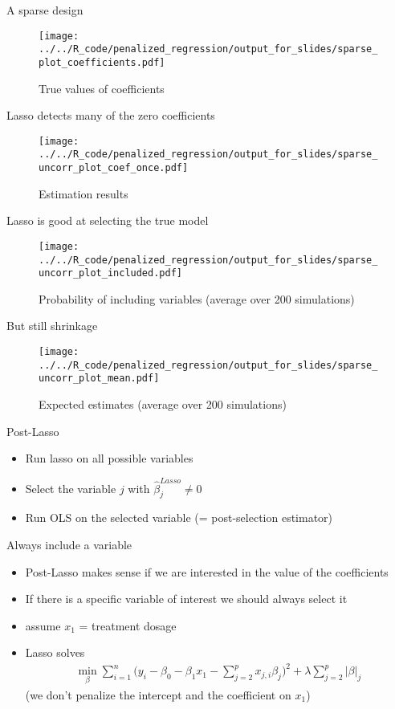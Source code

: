 \documentclass[xcolor=dvipsnames]{beamer}
\begin{document}
\begin{frame}{A sparse design}
\begin{figure}
  \texttt{[image: ../../R\_code/penalized\_regression/output\_for\_slides/sparse\_plot\_coefficients.pdf]}
   \caption{True values of coefficients}
\end{figure}
\end{frame}

\begin{frame}{Lasso detects many of the zero coefficients}
\begin{figure}
  \texttt{[image: ../../R\_code/penalized\_regression/output\_for\_slides/sparse\_uncorr\_plot\_coef\_once.pdf]}
   \caption{Estimation results}
\end{figure}
\end{frame}

\begin{frame}{Lasso is good at selecting the true model}
\begin{figure}
  \texttt{[image: ../../R\_code/penalized\_regression/output\_for\_slides/sparse\_uncorr\_plot\_included.pdf]}
   \caption{Probability of including variables (average over 200 simulations)}
\end{figure}
\end{frame}

\begin{frame}{But still shrinkage}
\begin{figure}
  \texttt{[image: ../../R\_code/penalized\_regression/output\_for\_slides/sparse\_uncorr\_plot\_mean.pdf]}
   \caption{Expected estimates (average over 200 simulations)}
\end{figure}
\end{frame}

\begin{frame}{Post-Lasso}
\begin{itemize}
  \item Run lasso on all possible variables 
  \item Select the variable $j$ with $\hat{\beta}_j^{Lasso} \neq 0$
  \item Run OLS on the selected variable (= post-selection estimator)
\end{itemize}
\end{frame}

\begin{frame}{Always include a variable}
\begin{itemize}
  \item Post-Lasso makes sense if we are interested in the value of the coefficients
  \item If there is a specific variable of interest we should always select it
  \item assume $x_1$ = treatment dosage
  \item Lasso solves 
  \begin{align*}
    \min_{\beta} \sum_{i=1}^n \Big(y_i - \beta_0 - \beta_1 x_1 - \sum_{j = 2}^p x_{j, i} \beta_j \Big)^2 + \lambda \sum_{j = 2}^p \lvert\beta\rvert_j   
  \end{align*}
  (we don't penalize the intercept and the coefficient on $x_1$)
\end{itemize}
\end{frame}
\end{document}
